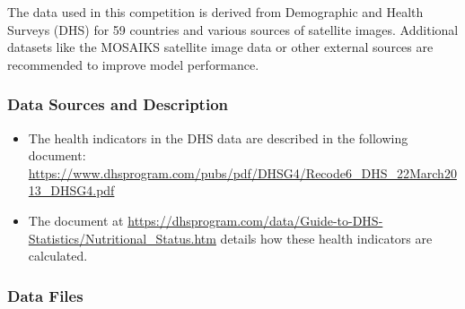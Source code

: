 \documentclass{article}
\begin{document}
The data used in this competition is derived from Demographic and Health Surveys (DHS) for 59 countries and various sources of satellite images. Additional datasets like the MOSAIKS satellite image data or other external sources are recommended to improve model performance.

\subsubsection{Data Sources and Description}

\begin{itemize}

\item The health indicators in the DHS data are described in the following document: \url{https://www.dhsprogram.com/pubs/pdf/DHSG4/Recode6_DHS_22March2013_DHSG4.pdf}

\item The document at \url{https://dhsprogram.com/data/Guide-to-DHS-Statistics/Nutritional_Status.htm} details how these health indicators are calculated.

\end{itemize}

\subsubsection{Data Files}
\end{document}
